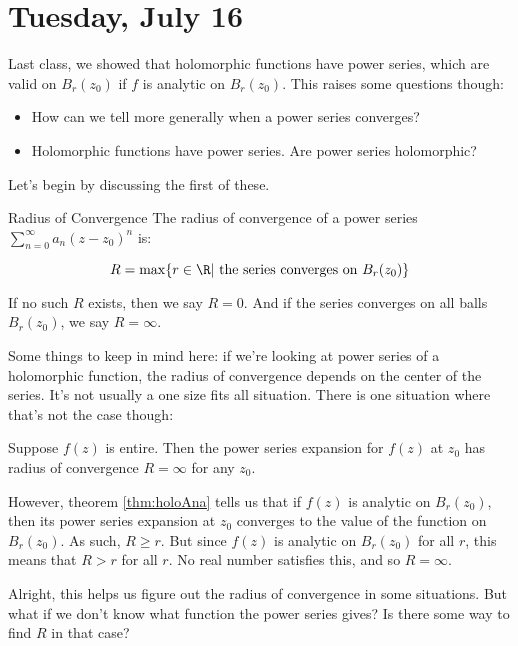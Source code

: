 \section{Tuesday, July 16}


Last class, we showed that holomorphic functions have power series, which are valid on $B_r(z_0)$ if $f$ is analytic on $B_r(z_0)$. This raises some questions though:

\begin{itemize}
\item How can we tell more generally when a power series converges?
\item Holomorphic functions have power series. Are power series holomorphic?
\end{itemize}

Let's begin by discussing the first of these.

\begin{defbo}{Radius of Convergence}{} The radius of convergence of a power series $\sum_{n = 0}^\infty a_n(z-z_0)^n$ is:

$$R = \max\{r\in \R| \text{ the series converges on } B_r(z_0)\}$$

If no such $R$ exists, then we say $R = 0$. And if the series converges on all balls $B_r(z_0)$, we say $R = \infty$.
\end{defbo}

Some things to keep in mind here: if we're looking at power series of a holomorphic function, the radius of convergence depends on the center of the series. It's not usually a one size fits all situation. There is one situation where that's not the case though:

\begin{ex}{}{} Suppose $f(z)$ is entire. Then the power series expansion for $f(z)$ at $z_0$ has radius of convergence $R = \infty$ for any $z_0$.

However, theorem \ref{thm:holoAna} tells us that if $f(z)$ is analytic on $B_r(z_0)$, then its power series expansion at $z_0$ converges to the value of the function on $B_r(z_0)$. As such, $R\ge r$. But since $f(z)$ is analytic on $B_r(z_0)$ for all $r$, this means that $R> r$ for all $r$. No real number satisfies this, and so $R = \infty$.
\end{ex}

Alright, this helps us figure out the radius of convergence in some situations. But what if we don't know what function the power series gives? Is there some way to find $R$ in that case?

